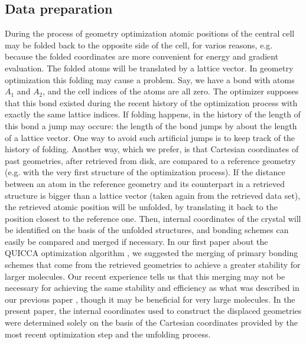 \documentclass[prl,aps,preprint,superbib,12pt]{revtex4}
\begin{document}
\subsection{Data preparation}
During the process of geometry optimization atomic positions
of the central cell may be folded back to the opposite side of the 
cell, for varios reasons, e.g. because the folded coordinates 
are more convenient for energy and gradient evaluation. The folded
atoms will be translated by a lattice vector.
In geometry optimization this folding may cause a problem. 
Say, we have a 
bond with atoms $A_{1}$ and $A_{2}$, and the cell indices of the
atoms are all zero. The optimizer supposes that this bond existed
during the recent history of the optimization process with exactly
the same lattice indices. If folding happens, in the history
of the length of this bond a jump may occure: the length of the
bond jumps by about the length of a lattice vector. 
One way to avoid such artificial jumps is to keep track
of the history of folding. Another way, which we prefer, is
that Cartesian coordinates of past geometries, after retrieved from 
disk, are compared to a reference geometry (e.g. with the     
very first structure of the optimization process). If the
distance between an atom in the reference geometry and its counterpart
in a retrieved structure is bigger than a lattice vector 
(taken again from the retrieved data set), the retrieved
atomic position will be unfolded, by translating it back 
to the position closest to the reference one.
Then, internal coordinates of the crystal will be identified on the
basis of the unfolded structures, and bonding schemes can easily
be compared and merged if necessary.
In our first paper about the QUICCA optimization algorithm 
\cite{KNemeth04}, we suggested the merging of primary
bonding schemes that come from the retrieved geometries to achieve
a greater stability for larger molecules. Our recent experience tells
us that this merging may not be necessary for achieving
the same stability and efficiency as what was described in our
previous paper \cite{KNemeth04}, though it may be beneficial
for very large molecules. In the present paper,
the internal coordinates used to construct the displaced geometries
were determined solely on the basis of the Cartesian coordinates
provided by the most recent optimization step and the unfolding 
process.
\end{document}
